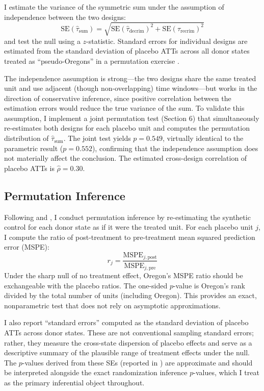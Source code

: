 \documentclass[12pt]{article}
\begin{document}
I estimate the variance of the symmetric sum under the assumption of independence between the two designs:
\begin{equation}
    \text{SE}(\hat{\tau}_{\text{sum}}) = \sqrt{\text{SE}(\hat{\tau}_{\text{decrim}})^2 + \text{SE}(\hat{\tau}_{\text{recrim}})^2}
    \label{eq:se_sum}
\end{equation}
and test the null using a $z$-statistic. Standard errors for individual designs are estimated from the standard deviation of placebo ATTs across all donor states treated as ``pseudo-Oregons'' in a permutation exercise \citep{abadie2010synthetic}.

The independence assumption is strong---the two designs share the same treated unit and use adjacent (though non-overlapping) time windows---but works in the direction of conservative inference, since positive correlation between the estimation errors would reduce the true variance of the sum. To validate this assumption, I implement a joint permutation test (Section 6) that simultaneously re-estimates both designs for each placebo unit and computes the permutation distribution of $\hat{\tau}_{\text{sum}}$. The joint test yields $p = 0.549$, virtually identical to the parametric result ($p = 0.552$), confirming that the independence assumption does not materially affect the conclusion. The estimated cross-design correlation of placebo ATTs is $\hat{\rho} = 0.30$.

\subsection{Permutation Inference}

Following \citet{abadie2010synthetic} and \citet{abadie2015comparative}, I conduct permutation inference by re-estimating the synthetic control for each donor state as if it were the treated unit. For each placebo unit $j$, I compute the ratio of post-treatment to pre-treatment mean squared prediction error (MSPE):
\begin{equation}
    r_j = \frac{\text{MSPE}_{j,\text{post}}}{\text{MSPE}_{j,\text{pre}}}
    \label{eq:mspe_ratio}
\end{equation}
Under the sharp null of no treatment effect, Oregon's MSPE ratio should be exchangeable with the placebo ratios. The one-sided $p$-value is Oregon's rank divided by the total number of units (including Oregon). This provides an exact, nonparametric test that does not rely on asymptotic approximations.

I also report ``standard errors'' computed as the standard deviation of placebo ATTs across donor states. These are not conventional sampling standard errors; rather, they measure the cross-state dispersion of placebo effects and serve as a descriptive summary of the plausible range of treatment effects under the null. The $p$-values derived from these SEs (reported in ) are approximate and should be interpreted alongside the exact randomization inference $p$-values, which I treat as the primary inferential object throughout.
\end{document}
